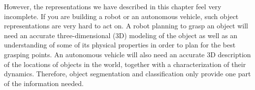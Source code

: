 However, the representations we have described in this chapter feel very incomplete. If you are building a robot or an autonomous vehicle, such object representations are very hard to act on. A robot planning to grasp an object will need an accurate three-dimensional (3D) modeling of the object as well as an understanding of some of its physical properties in order to plan for the best grasping points. An autonomous vehicle will also need an accurate 3D description of the locations of objects in the world, together with a characterization of their dynamics. Therefore, object segmentation and classification only provide one part of the information needed.























